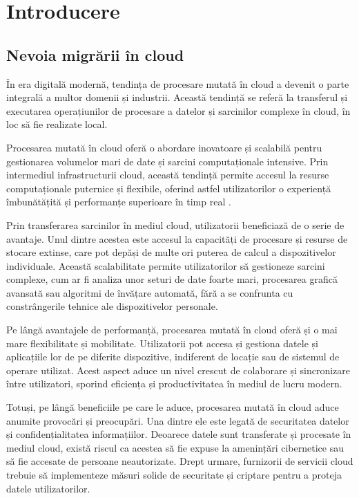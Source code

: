 \chapter{Introducere}

\section{Nevoia migrării în cloud}

În era digitală modernă, tendința de procesare mutată în cloud a devenit o parte integrală a multor domenii și industrii. Această tendință se referă la transferul și executarea operațiunilor de procesare a datelor și sarcinilor complexe în cloud, în loc să fie realizate local.

Procesarea mutată în cloud oferă o abordare inovatoare și scalabilă pentru gestionarea volumelor mari de date și sarcini computaționale intensive. Prin intermediul infrastructurii cloud, această tendință permite accesul la resurse computaționale puternice și flexibile, oferind astfel utilizatorilor o experiență îmbunătățită și performanțe superioare în timp real \cite{benefits-of-cloud-computing}.

Prin transferarea sarcinilor în mediul cloud, utilizatorii beneficiază de o serie de avantaje. Unul dintre acestea este accesul la capacități de procesare și resurse de stocare extinse, care pot depăși de multe ori puterea de calcul a dispozitivelor individuale. Această scalabilitate permite utilizatorilor să gestioneze sarcini complexe, cum ar fi analiza unor seturi de date foarte mari, procesarea grafică avansată sau algoritmi de învățare automată, fără a se confrunta cu constrângerile tehnice ale dispozitivelor personale.

Pe lângă avantajele de performanță, procesarea mutată în cloud oferă și o mai mare flexibilitate și mobilitate. Utilizatorii pot accesa și gestiona datele și aplicațiile lor de pe diferite dispozitive, indiferent de locație sau de sistemul de operare utilizat. Acest aspect aduce un nivel crescut de colaborare și sincronizare între utilizatori, sporind eficiența și productivitatea în mediul de lucru modern.

Totuși, pe lângă beneficiile pe care le aduce, procesarea mutată în cloud aduce anumite provocări și preocupări. Una dintre ele este legată de securitatea datelor și confidențialitatea informațiilor. Deoarece datele sunt transferate și procesate în mediul cloud, există riscul ca acestea să fie expuse la amenințări cibernetice sau să fie accesate de persoane neautorizate. Drept urmare, furnizorii de servicii cloud trebuie să implementeze măsuri solide de securitate și criptare pentru a proteja datele utilizatorilor.

